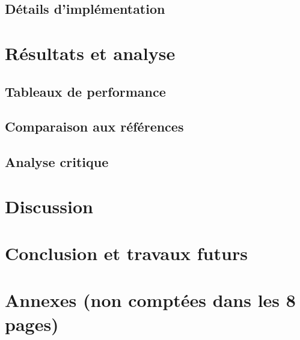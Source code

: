 \documentclass{article}
\begin{document}
\subsection{Détails d'implémentation}

\section{Résultats et analyse}
\subsection{Tableaux de performance}
\subsection{Comparaison aux références}
\subsection{Analyse critique}

\section{Discussion}

\section{Conclusion et travaux futurs}

\begin{thebibliography}{99}
\end{thebibliography}

\appendix
\section{Annexes (non comptées dans les 8 pages)}
\end{document}
